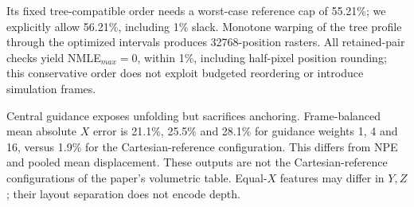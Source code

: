 \documentclass[10pt]{article}
\begin{document}
Its fixed tree-compatible order needs a worst-case reference cap of 55.21\%; we explicitly allow 56.21\%, including 1\% slack. Monotone warping of the tree profile through the optimized intervals produces 32768-position rasters. All retained-pair checks yield NMLE$_{max}=0$, within 1\%, including half-pixel position rounding; this conservative order does not exploit budgeted reordering or introduce simulation frames.

Central guidance exposes unfolding but sacrifices anchoring. Frame-balanced mean absolute $X$ error is 21.1\%, 25.5\% and 28.1\% for guidance weights 1, 4 and 16, versus 1.9\% for the Cartesian-reference configuration. This differs from NPE and pooled mean displacement. These outputs are not the Cartesian-reference configurations of the paper's volumetric table. Equal-$X$ features may differ in $Y,Z$; their layout separation does not encode depth.



\end{document}
